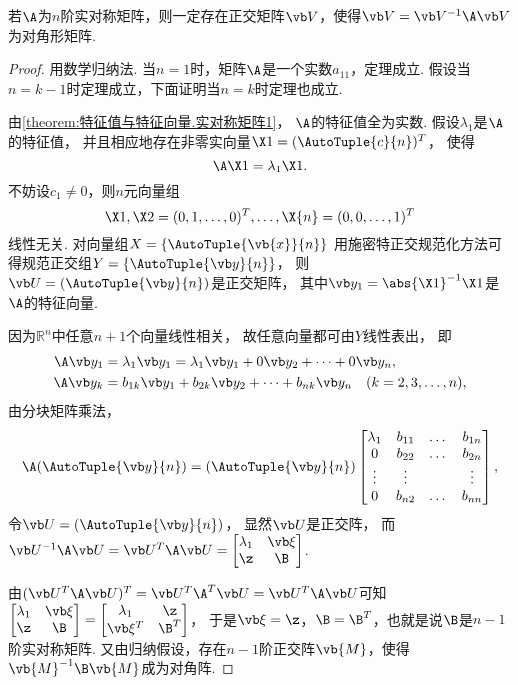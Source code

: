 \begin{theorem}\label{theorem:特征值与特征向量.实对称矩阵3}
若\(\A\)为\(n\)阶实对称矩阵，则一定存在正交矩阵\(\Q\)，使得\(\V = \Q^{-1}\A\Q\)为对角形矩阵.
\begin{proof}
\def\M{\vb{M}}%
用数学归纳法.
当\(n=1\)时，矩阵\(\A\)是一个实数\(a_{11}\)，定理成立.
假设当\(n=k-1\)时定理成立，下面证明当\(n=k\)时定理也成立.

由\cref{theorem:特征值与特征向量.实对称矩阵1}，
\(\A\)的特征值全为实数.
假设\(\lambda_1\)是\(\A\)的特征值，
并且相应地存在非零实向量\(\X1=(\AutoTuple{c}{n})^T\)，
使得\[
	\A\X1=\lambda_1\X1.
\]
不妨设\(c_1\neq0\)，则\(n\)元向量组\[
	\X1,\X2=(0,1,\dotsc,0)^T,\dotsc,\X{n}=(0,0,\dotsc,1)^T
\]线性无关.
对向量组\(X=\{\AutoTuple{\vb{x}}{n}\}\)
用施密特正交规范化方法可得规范正交组\(Y=\{\AutoTuple{\y}{n}\}\)，
则\(\P=(\AutoTuple{\y}{n})\)是正交矩阵，
其中\(\y_1=\abs{\X1}^{-1}\X1\)是\(\A\)的特征向量.

因为\(\mathbb{R}^n\)中任意\(n+1\)个向量线性相关，
故任意向量都可由\(Y\)线性表出，
即\begin{align*}
	\A\y_1 &= \lambda_1\y_1 = \lambda_1\y_1 + 0\y_2 + \dotsb + 0\y_n, \\
	\A\y_k &= b_{1k}\y_1 + b_{2k}\y_2 + \dotsb + b_{nk}\y_n \quad(k=2,3,\dotsc,n),
\end{align*}
由分块矩阵乘法，\[
	\A(\AutoTuple{\y}{n})
	= (\AutoTuple{\y}{n})
	\begin{bmatrix}
		\lambda_1 & b_{11} & \dots & b_{1n} \\
		0 & b_{22} & \dots & b_{2n} \\
		\vdots & \vdots & & \vdots \\
		0 & b_{n2} & \dots & b_{nn}
	\end{bmatrix},
\]
令\(\P=(\AutoTuple{\y}{n})\)，
显然\(\P\)是正交阵，
而\(\P^{-1}\A\P=\P^T\A\P=\begin{bmatrix}
	\lambda_1 & \a \\
	\z & \B
\end{bmatrix}\).

由\((\P^T\A\P)^T=\P^T\A^T\P=\P^T\A\P\)可知\(\begin{bmatrix}
	\lambda_1 & \a \\
	\z & \B
\end{bmatrix}
= \begin{bmatrix}
	\lambda_1 & \z \\
	\a^T & \B^T
\end{bmatrix}\)，
于是\(\a=\z\)，\(\B=\B^T\)，也就是说\(\B\)是\(n-1\)阶实对称矩阵.
又由归纳假设，存在\(n-1\)阶正交阵\(\M\)，使得\(\M^{-1}\B\M\)成为对角阵.


\end{proof}
\end{theorem}
